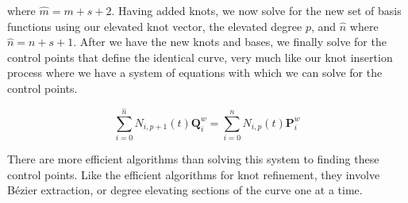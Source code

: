 where \(\hat{m} = m+s+2\).  Having added knots, we now solve for the new set of basis functions using our elevated knot vector, the elevated degree \(p\), and \(\hat{n}\) where \(\hat{n} = n+s+1\).  After we have the new knots and bases, we finally solve for the control points that define the identical curve, very much like our knot insertion process where we have a system of equations with which we can solve for the control points.

\begin{equation}
\sum^{\hat{n}}_{i=0} N_{i,p+1}(t) \mathbf{Q}_i^w = \sum^{n}_{i=0} N_{i,p}(t) \mathbf{P}_i^w
\end{equation}

There are more efficient algorithms than solving this system to finding these control points. Like the efficient algorithms for knot refinement, they involve Bézier extraction, or degree elevating sections of the curve one at a time.





 
{}


